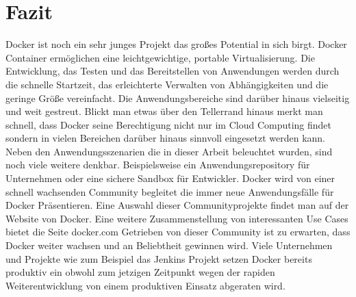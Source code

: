 \chapter{Fazit}
\label{sec:fazit}
Docker ist noch ein sehr junges Projekt das großes Potential in sich birgt. 
Docker Container ermöglichen eine leichtgewichtige, portable Virtualisierung. Die Entwicklung, das Testen und das Bereitstellen von Anwendungen werden durch die schnelle Startzeit, das erleichterte Verwalten von Abhängigkeiten und die geringe Größe vereinfacht. Die Anwendungsbereiche sind darüber hinaus vielseitig und weit gestreut. Blickt man etwas über den Tellerrand hinaus merkt man schnell, dass Docker seine Berechtigung nicht nur im Cloud Computing findet sondern in vielen Bereichen darüber hinaus sinnvoll eingesetzt werden kann.
Neben den Anwendungsszenarien die in dieser Arbeit beleuchtet wurden, sind noch viele weitere denkbar. Beispielsweise ein Anwendungsrepository für Unternehmen oder eine sichere Sandbox für Entwickler.
Docker wird von einer schnell wachsenden Community begleitet die immer neue Anwendungsfälle für Docker Präsentieren. Eine Auswahl dieser Communityprojekte findet man auf der Website von Docker. \cite{docker_docker_2014} Eine weitere Zusammenstellung von interessanten Use Cases bietet die Seite docker.com \cite{docker_use_????}
Getrieben von dieser Community ist zu erwarten, dass Docker weiter wachsen und an Beliebtheit gewinnen wird.
Viele Unternehmen und Projekte wie zum Beispiel das Jenkins Projekt setzen Docker bereits produktiv ein obwohl zum jetzigen Zeitpunkt wegen der rapiden Weiterentwicklung von einem produktiven Einsatz abgeraten wird.